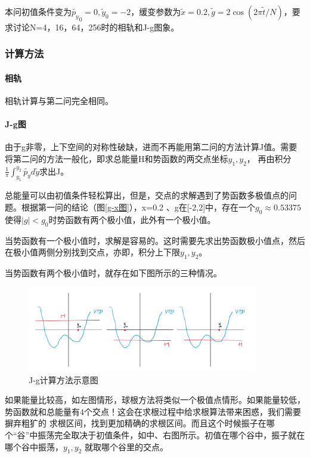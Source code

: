 \documentclass[10pt, a4paper]{article}
\newcommand{\wx}{\widetilde{x}}
\newcommand{\wy}{\widetilde{y}}
\newcommand{\wg}{\widetilde{g}}
\newcommand{\wt}{\widetilde{t}}
\newcommand{\wpy}{\widetilde{p_y}}
\begin{document}
    本问初值条件变为$\wpy_0=0,\wy_0=-2$，缓变参数为$\wx=0.2,\wg=2\cos{(2\pi\wt/N)}$，要求讨论N=4，16，64，256时的相轨和J-g图象。

    \subsubsection{计算方法}

    \paragraph{相轨}

    相轨计算与第二问完全相同。

    \paragraph{J-g图}

    由于g非零，上下空间的对称性破缺，进而不再能用第二问的方法计算J值。需要将第二问的方法一般化，即求总能量H和势函数的两交点坐标$y_1,y_2$，
    再由积分$\frac{1}{\pi}\int_{y_1}^{y_2}\wpy d\wy$求出J。

    总能量可以由初值条件轻松算出，但是，交点的求解遇到了势函数多极值点的问题。根据第一问的结论（图\ref{g-x图}），x=0.2
    、g在[-2,2]中，存在一个$g_0\approx0.53375$使得$|g|<g_0$时势函数有两个极小值，此外有一个极小值。

    当势函数有一个极小值时，求解是容易的。这时需要先求出势函数极小值点，然后在极小值两侧分别找到交点，亦即，积分上下限$y_1,y_2$。

    当势函数有两个极小值时，就存在如下图所示的三种情况。

    \begin{figure}[H]
        \centering
        \includegraphics[width=0.9\textwidth]{J-g计算方法示意图.png}
        \caption{J-g计算方法示意图}\label{J-g计算方法示意图}
    \end{figure}

    如果能量比较高，如左图情形，球根方法将类似一个极值点情形。如果能量较低，势函数就和总能量有4个交点！这会在求根过程中给求根算法带来困惑，我们需要摒弃粗犷的
    求根区间，找到更加精确的求根区间。而且这个时候振子在哪个“谷”中振荡完全取决于初值条件，如中、右图所示。初值在哪个谷中，振子就在哪个谷中振荡，$y_1,y_2$
    就取哪个谷里的交点。
\end{document}
